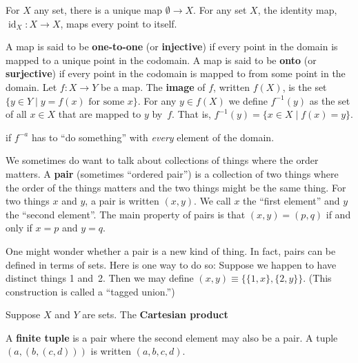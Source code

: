\documentclass[10pt, a4paper, twocolumn]{article}
\newcommand{\defn}[1]{\textbf{#1}}
\begin{document}
For $X$ any set, there is a unique map $\emptyset \to X$. For any set $X$, the identity
map, $\operatorname{id}_X : X \to X$, maps every point to itself.

A map is said to be \defn{one-to-one} (or \defn{injective}) if every point in
the domain is mapped to a unique point in the codomain. A map is said to be
\defn{onto} (or \defn{surjective}) if every point in the codomain is mapped to
from some point in the domain. Let $f:X \to Y$ be a map. The \defn{image} of $f$,
written $f(X)$, is the set $\{y \in Y \mid \text{$y = f(x)$ for some $x$}\}$. For any
$y \in f(X)$ we define $f^{-1}(y)$ as the set of all $x \in X$ that are mapped to
$y$ by~$f$. That is, $f^{-1}(y) = \{ x\in X\mid f(x) = y\}$.

if $f^{-a}$ has to “do something” with \emph{every} element of
the domain.


We sometimes do want to talk about collections of things where the order
matters. A \defn{pair} (sometimes “ordered pair”) is a collection of two things
where the order of the things matters and the two things might be the same
thing. For two things $x$ and $y$, a pair is written $(x, y)$. We call $x$ the
“first element” and $y$ the “second element”. The main property of pairs is that
$(x,y)=(p,q)$ if and only if $x=p$ and $y=q$.

One might wonder whether a pair is a new kind of thing. In fact, pairs can be
defined in terms of sets. Here is one way to do so: Suppose we happen to have
distinct things 1 and~2. Then we may define $(x, y) \equiv \{\{1, x\}, \{2,
y\}\}$. (This construction is called a “tagged union.”)

Suppose $X$ and $Y$ are sets. The \defn{Cartesian product} 


A \defn{finite tuple} is a pair where the second element may also be a pair. A
tuple $(a, (b, (c, d)))$ is written $(a, b, c, d)$. 
\end{document}
